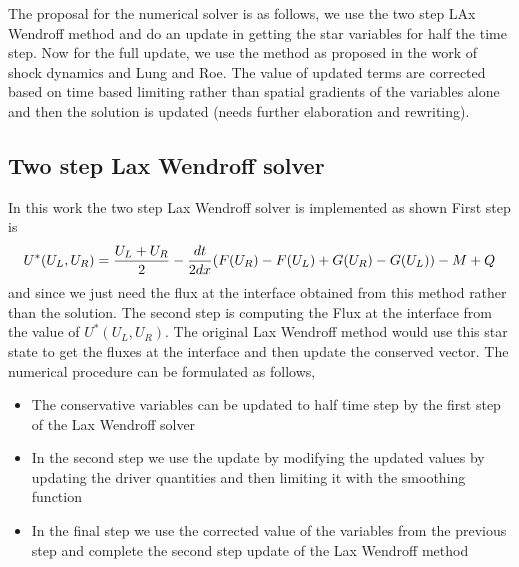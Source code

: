 \documentclass[a4paper,16pt]{article}
\begin{document}
The proposal for the numerical solver is as follows, we use the two step LAx Wendroff method and do an update in getting the star variables for half the time step.  Now for the full update, we use the method as proposed in the work of shock dynamics and Lung and Roe. The value of updated terms are corrected based on time based limiting rather than spatial gradients of the variables alone and then the solution is updated (needs further elaboration and rewriting). 

\subsection{Two step Lax Wendroff solver}
In this work the two step Lax Wendroff solver is implemented as shown
First step is
\begin{equation}
U^*(U_L,U_R) = \frac{U_L+ U_R}{2} - \frac{dt}{2 dx}(F(U_R)-F(U_L) + G(U_R)-G(U_L)) - M + Q   \\
\end{equation}
and since we just need the flux at the interface obtained from this method rather than the solution. The second step is computing the Flux at the interface from the value of $U^*(U_L,U_R)$. The original Lax Wendroff method would use this star state to get the fluxes at the interface and then update the conserved vector.
The numerical procedure can be formulated as follows, 
 \begin{itemize}
 	\item The conservative variables can be updated to half time step by the first step of the Lax Wendroff solver
 	\item In the second step we use the update by modifying the updated values by updating the driver quantities and then limiting it with the smoothing function 
 	\item In the final step we use the corrected value of the variables from the previous step and complete the second step update of the Lax Wendroff method
 \end{itemize}
\end{document}
